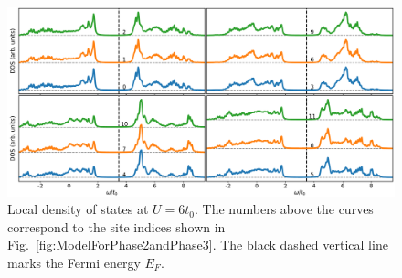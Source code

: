 \documentclass[aps,prb,amsfonts,amsmath,amssymb,showpacs,groupedaddress,superscriptaddress]{revtex4-1}
\begin{document}
\begin{figure}[p]
    \includegraphics[width=0.95\columnwidth]{fig/CPTForPhase2andPhase3LDOS.pdf}
    \caption{\label{fig:CPTForPhase2andPhase3LDOS} Local density of states at $U = 6 t_{0}$. The numbers above the curves correspond to the site indices shown in Fig.~\ref{fig:ModelForPhase2andPhase3}. The black dashed vertical line marks the Fermi energy $E_{F}$.}
\end{figure}


\end{document}
